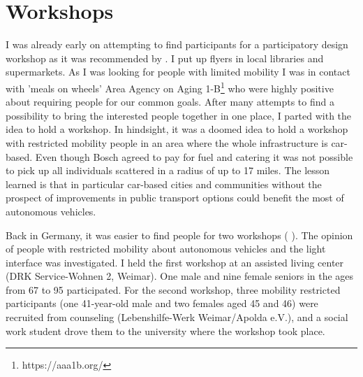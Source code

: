 \section{Workshops}
I was already early on attempting to find participants for a participatory design workshop as it was recommended by \cite{Pettersson}. I put up flyers in local libraries and supermarkets. As I was looking for people with limited mobility I was in contact with 'meals on wheels' Area Agency on Aging 1-B\footnote{https://aaa1b.org/} who were highly positive about requiring people for our common goals. After many attempts to find a possibility to bring the interested people together in one place, I parted with the idea to hold a workshop. In hindsight, it was a doomed idea to hold a workshop with restricted mobility people in an area where the whole infrastructure is car-based. Even though Bosch agreed to pay for fuel and catering it was not possible to pick up all individuals scattered in a radius of up to 17 miles. The lesson learned is that in particular car-based cities and communities without the prospect of improvements in public transport options could benefit the most of autonomous vehicles. 

Back in Germany, it was easier to find people for two workshops ( \emph{}). The opinion of people with restricted mobility about autonomous vehicles and the light interface was investigated. I held the first workshop at an assisted living center (DRK Service-Wohnen 2, Weimar). One male and nine female seniors in the ages from 67 to 95 participated. For the second workshop, three mobility restricted participants (one 41-year-old male and two females aged 45 and 46) were recruited from counseling (Lebenshilfe-Werk Weimar/Apolda e.V.), and a social work student drove them to the university where the workshop took place. 

